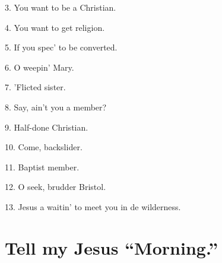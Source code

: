 \documentclass[a5paper,10pt]{book}
\begin{document}
\begin{song}

\end{song}

\begin{multicols}{2}
\begin{stanza}
\item[3.]
  You want to be a Christian.

\item[4.]
  You want to get religion.

\item[5.]
  If you spec' to be converted.

\item[6.]
  O weepin' Mary.

\item[7.]
  'Flicted sister.

\item[8.]
  Say, ain't you a member?

\item[9.]
  Half-done Christian.

\item[10.]
  Come, backslider.

\item[11.]
  Baptist member.

\item[12.]
  O seek, brudder Bristol.

\item[13.]
  Jesus a waitin' to meet you in de wilderness.
\end{stanza}
\end{multicols}

\begin{extra}
\end{extra}


\newpage
\section{Tell my Jesus ``Morning.''}
\thispagestyle{empty}

\begin{song}
  \

\end{song}
\end{document}
